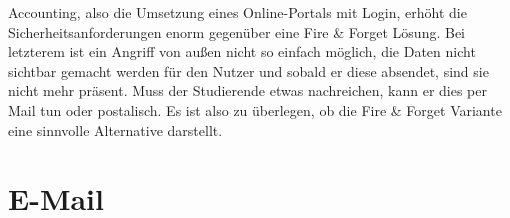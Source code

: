\documentclass[ngerman]{tudscrreprt}
\begin{document}
Accounting, also die Umsetzung eines Online-Portals mit Login, erhöht die Sicherheitsanforderungen enorm gegenüber eine Fire \& Forget Lösung. Bei letzterem ist ein Angriff von außen nicht so einfach möglich, die Daten nicht sichtbar gemacht werden für den Nutzer und sobald er diese absendet, sind sie nicht mehr präsent. Muss der Studierende etwas nachreichen, kann er dies per Mail tun oder postalisch. Es ist also zu überlegen, ob die Fire \& Forget Variante eine sinnvolle Alternative darstellt.

\chapter{E-Mail}
\end{document}
